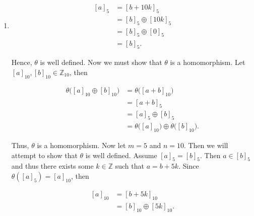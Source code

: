 \documentclass[12pt]{article}
\makeatletter
\theoremstyle{definition}
\theoremstyle{remark}
\renewenvironment{proof}[1][\proofname]{\par
  \pushQED{\qed}%
  \normalfont \topsep6\p@\@plus6\p@\relax
  \list{}{\leftmargin=0mm
          \rightmargin=0mm
          \settowidth{\itemindent}{\itshape#1}%
          \labelwidth=\itemindent
          \parsep=0pt \listparindent=\parindent 
  }
  \item[\hskip\labelsep
        \itshape
    #1\@addpunct{.}]\ignorespaces
}{%
  \popQED\endlist\@endpefalse
}
\let\oldproofname=\proofname
\renewcommand{\proofname}{\bf{\textit{\oldproofname}}}
\makeatother
\begin{document}
\begin{enumerate}[leftmargin=*]
\begin{enumerate}[label=\alph*)]
\begin{proof}
                        \begin{equation*}
                            \begin{split}
                                [a]_5&=[b+10k]_5 \\
                                &= [b]_5\oplus[10k]_5 \\
                                &= [b]_5\oplus [0]_5 \\
                                &= [b]_5.
                            \end{split}
                        \end{equation*}
                        
                        Hence, $\theta$ is well defined. Now we must show that $\theta$ is a homomorphism. Let $[a]_{10},[b]_{10}\in\mathbb{Z}_{10}$, then 
                        
                        \begin{equation*}
                            \begin{split}
                                \theta\big([a]_{10}\oplus[b]_{10}\big) &= \theta\big([a+b]_{10}\big) \\
                                &=[a+b]_5 \\
                                &= [a]_5\oplus[b]_5 \\
                                &=\theta\big([a]_{10}\big)\oplus\theta\big([b]_{10}\big).
                            \end{split}
                        \end{equation*}
                        
                        Thus, $\theta$ is a homomorphism. Now let $m=5$ and $n=10$. Then we will attempt to show that $\theta$ is well defined. Assume $[a]_5=[b]_5$. Then $a\in[b]_5$ and thus there exists some $k\in\mathbb{Z}$ such that $a=b+5k$. Since $\theta([a]_5)=[a]_{10}$, then 
                        
                        \begin{equation*}
                            \begin{split}
                                [a]_{10} &= [b+5k]_{10} \\
                                &= [b]_{10}\oplus[5k]_{10}.
                            \end{split}
                        \end{equation*}
                        

\end{proof}
\end{enumerate}
\end{enumerate}
\end{document}
